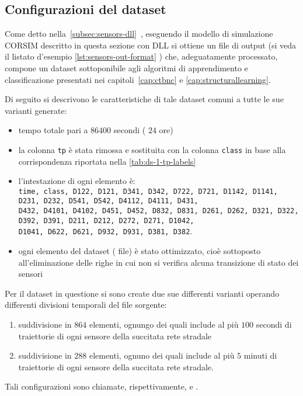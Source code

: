 \newpage
\subsection{Configurazioni del dataset}
Come detto nella~\autoref{subsec:sensors-dll}~, eseguendo il modello di simulazione \acs{CORSIM} descritto in questa sezione con  \acs{DLL} si ottiene un file di output (si veda il listato d'esempio \ref{lst:sensors-out-format} ) che, adeguatamente processato, compone un dataset sottoponibile agli algoritmi di apprendimento e classificazione presentati nei capitoli~\ref{cap:ctbnc} e \ref{cap:structurallearning}.

Di seguito si descrivono le caratteristiche di tale dataset comuni a tutte le sue varianti generate:
\begin{itemize}
	\item tempo totale pari a $86400$ secondi (\ie{} $24$ ore)
	\item la colonna \lstinline[]|tp| è stata rimossa e sostituita con la colonna \lstinline[]|class| in base alla corrispondenza riportata nella \vref{tab:ds-1-tp-labels}
	\item l'intestazione di ogni elemento è: \\ \lstinline[]|time, class, D122, D121, D341, D342, D722, D721, D1142, D1141, D231, D232, D541, D542, D4112, D4111, D431, |\\\lstinline[]|D432, D4101, D4102, D451, D452, D832, D831, D261, D262, D321, D322, D392, D391, D211, D212, D272, D271, D1042, |\\\lstinline[]|D1041, D622, D621, D932, D931, D381, D382|.
	\item ogni elemento del dataset (\ie{} file) è stato ottimizzato, cioè sottoposto all'eliminazione delle righe in cui non si verifica alcuna transizione di stato dei sensori
\end{itemize}

Per il dataset in questione si sono create due sue differenti varianti operando differenti divisioni temporali del file sorgente:
\begin{enumerate}
	\item suddivisione in $864$ elementi, ognungo dei quali include al più $100$ secondi di traiettorie di ogni sensore della succitata rete stradale
	\item suddivisione in $288$ elementi, ognuno dei quali include al più $5$ minuti di traiettorie di ogni sensore della succitata rete stradale.
\end{enumerate}
Tali configurazioni sono chiamate, rispettivamente,  e .

